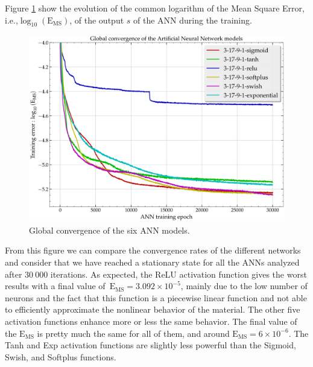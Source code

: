 \documentclass[algorithms,article,submit,pdftex,oneauthors]{Definitions/mdpi}
\makeatletter
\DeclareRobustCommand{\ie}{i.e.,\@\xspace}
\DeclareRobustCommand{\MSE}{\text{E}_\text{MS}}
\makeatother
\begin{document}
Figure \ref{fig:ANN-conv} show the evolution of the common logarithm of the Mean Square Error, \ie $\log_{10}(\MSE)$, of the output $s$ of the ANN during the training.
\begin{figure}[h!]
\centering
\includegraphics[width=0.8\columnwidth]{Figures/3Cr2Mo-convergence-17-9}
\caption{Global convergence of the six ANN models.}
\label{fig:ANN-conv}
\end{figure}
From this figure we can compare the convergence rates of the different networks and consider that we have reached a stationary state for all the ANNs analyzed after $30~000$ iterations.
As expected, the ReLU activation function gives the worst results with a final value of~$\MSE=3.092\times10^{-5}$, mainly due to the low number of neurons and the fact that this function is a piecewise linear function and not able to efficiently approximate the nonlinear behavior of the material.
The other five activation functions enhance more or less the same behavior. 
The final value of the $\MSE$ is pretty much the same for all of them, and around $\MSE=6\times10^{-6}$.
The Tanh and Exp activation functions are slightly less powerful than the Sigmoid, Swish, and Softplus functions.
\end{document}
